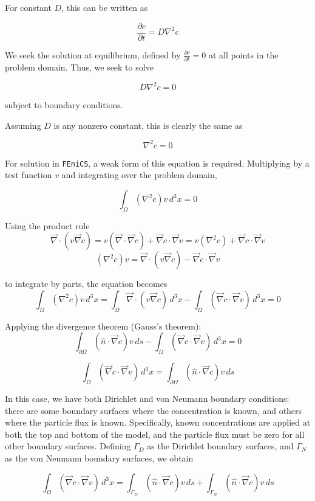 \documentclass{article}
\begin{document}
For constant $D$, this can be written as

$$\frac{\partial c}{\partial t} = D \nabla^2 c$$

We seek the solution at equilibrium, defined by
$\frac{\partial c}{\partial t} = 0$ at all points in the problem domain.
Thus, we seek to solve

$$D \nabla^2 c = 0$$

subject to boundary conditions.

Assuming $D$ is any nonzero constant, this is clearly the same as

$$ \nabla^2 c = 0$$

For solution in \texttt{FEniCS}, a weak form of this equation is required.
Multiplying by a test function $v$ and integrating over the problem domain,

$$\int_{\Omega} \left(\nabla^2 c \right) v \,d^3x = 0$$

Using the product rule
$$\vec{\nabla} \cdot \left( v \vec{\nabla} c \right) =
v \left(\vec{\nabla} \cdot \vec{\nabla} c \right) + \vec{\nabla}c \cdot \vec{\nabla}v =
v \left(\nabla^2 c \right) + \vec{\nabla}c \cdot \vec{\nabla}v$$
$$\left(\nabla^2 c \right) v =
\vec{\nabla} \cdot \left( v \vec{\nabla} c \right) - \vec{\nabla}c \cdot \vec{\nabla}v$$

to integrate by parts, the equation becomes
$$ \int_{\Omega} \left(\nabla^2 c \right) v \,d^3x =
\int_{\Omega} \vec{\nabla} \cdot \left( v \vec{\nabla} c \right) \,d^3x
- \int_{\Omega} \left( \vec{\nabla}c \cdot \vec{\nabla}v \right) \,d^3x =0$$

Applying the divergence theorem (Gauss's theorem):
$$\int_{\partial\Omega} \left( \hat{n} \cdot \vec{\nabla} c \right) v\,ds
- \int_{\Omega} \left( \vec{\nabla}c \cdot \vec{\nabla}v \right) \,d^3x = 0$$

$$\int_{\Omega} \left( \vec{\nabla}c \cdot \vec{\nabla}v \right) \,d^3x =
\int_{\partial\Omega} \left( \hat{n} \cdot \vec{\nabla} c \right) v\,ds$$

In this case, we have both Dirichlet and von Neumann boundary conditions:
there are some boundary surfaces where the concentration is known,
and others where the particle flux is known.
Specifically, known concentrations are applied at both the top and bottom of the model,
and the particle flux must be zero for all other boundary surfaces.
Defining $\Gamma_D$ as the Dirichlet boundary surfaces,
and $\Gamma_N$ as the von Neumann boundary surfaces, we obtain

$$\int_{\Omega} \left( \vec{\nabla}c \cdot \vec{\nabla}v \right) \,d^3x =
\int_{\Gamma_D} \left( \hat{n} \cdot \vec{\nabla} c \right) v\,ds
+\int_{\Gamma_N} \left( \hat{n} \cdot \vec{\nabla} c \right) v\,ds$$
\end{document}

